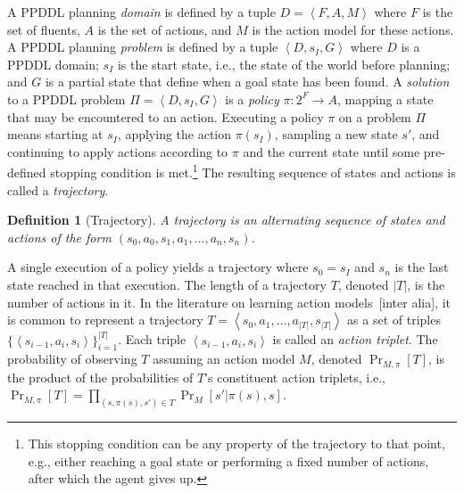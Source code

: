 \documentclass[letterpaper]{article} %
\newtheorem{definition}{Definition}
\newcommand{\tuple}[1]{\ensuremath{\left \langle #1 \right \rangle }}
\begin{document}
A PPDDL planning \emph{domain} is defined by a tuple 
$D=\tuple{F, A, M}$
where $F$ is the set of fluents, 
$A$ is the set of actions,
and $M$ is the action model for these actions.  
A PPDDL planning \emph{problem} is defined by a tuple 
$\tuple{D, s_I, G}$ where $D$ is a PPDDL domain;
$s_I$ is the start state, i.e., the state of the world before planning;  
and $G$ is a partial state that define when a goal state has been found. 
A \emph{solution} to a PPDDL problem $\Pi=\tuple{D, s_I, G}$ is a \emph{policy} $\pi:2^F\rightarrow A$,  
mapping a state that may be encountered to an action. 
Executing a policy $\pi$ on a problem $\Pi$ means starting at $s_I$, applying the action $\pi(s_I)$, 
sampling a new state $s'$, and continuing to apply actions according to $\pi$ and the current state until some pre-defined stopping condition is met.\footnote{This stopping condition can be any property of the trajectory to that point, e.g., either reaching a goal state or performing a fixed number of actions, after which the agent gives up.} 
The resulting sequence of states and actions is called a \emph{trajectory}. 

\begin{definition}[Trajectory]
A trajectory is an alternating sequence of states and actions of the form $(s_0, a_0, s_1, a_1,\ldots, a_n, s_n)$. 
\end{definition}
A single execution of a policy yields a trajectory where $s_0=s_I$ and $s_n$ is the last state reached in that execution. 
The length of a trajectory $T$, denoted $|T|$, is the number of actions in it.  
In the literature on learning action models~[inter alia]\cite{wang1994learning,wang1995learning,walsh2008efficient,stern2017efficientAndSafe,arora2018review}, 
it is common to represent a trajectory $T=\tuple{s_0, a_1, \ldots, a_{|T|}, s_{|T|}}$
as a set of triples 
$\big\{\tuple{s_{i-1},a_i,s_i}\big\}_{i=1}^{|T|}$. 
Each triple $\tuple{s_{i-1},a_i,s_i}$ is called an \emph{action triplet}. 
The probability of observing $T$ assuming an action model $M$, denoted $\Pr_{M,\pi}[T]$, is the product of the probabilities of $T$'s constituent action triplets, i.e., $\Pr_{M,\pi}[T]=\prod_{(s,\pi(s),s')\in T} \Pr_M[s'|\pi(s),s]$. 
\end{document}

